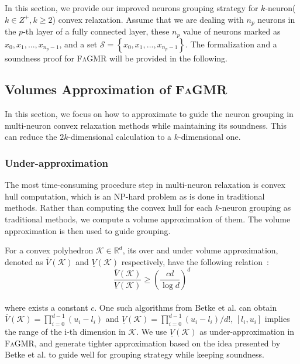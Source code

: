 \documentclass[runningheads]{llncs}
\newcommand{\ourtool}{\textsc{FaGMR}\xspace}
\begin{document}
In this section, we provide our improved neurons grouping
strategy for $k$-neuron($k \in Z^{+}, k \geq 2$) convex relaxation.
Assume that we are dealing with $n_{p}$ neurons in the $p$-th layer of a fully connected layer, these $n_{p}$ value of neurons marked as $x_{0},x_{1},...,x_{n_{p}-1}$, and a set $\mathcal{S}=\left \{x_{0},x_{1},...,x_{n_{p}-1}\right \}$.
The formalization and a soundness proof for \ourtool will be provided in the following.

%
%
%
\subsection{Volumes Approximation of \ourtool}\label{mvee}
In this section, we focus on how to approximate to guide the neuron grouping in multi-neuron convex relaxation methods while maintaining its soundness. This can reduce the $2k$-dimensional calculation to a $k$-dimensional one. 

\subsubsection{Under-approximation}\label{mvee}

The most time-consuming procedure step in multi-neuron relaxation is
convex hull computation, which is an NP-hard problem as is done in traditional methods.
Rather than computing the convex hull for each $k$-neuron grouping
as traditional methods,
we compute a volume approximation of them.
The volume approximation is then used to guide grouping.

For a convex polyhedron $\mathcal{K} \in \mathbb{R}^{d}$, its
over and under volume approximation, denoted as $\overline{V}(\mathcal{K})$ and $\underline{V}(\mathcal{K})$ respectively,
have the following relation~\cite{elekes1986geometric}:
$$
\frac{\overline{V}(\mathcal{K})}{\underline{V}(\mathcal{K})} \geq \left(\frac{cd}{\log d}\right)^{d}
$$\\
where exists a constant $c$.
One such algorithms from Betke et al.
can obtain $\overline{V}(\mathcal{K}) = \prod_{i=0}^{d-1}(u_{i}-l_{i})$ and $\underline{V}(\mathcal{K}) = \prod_{i=0}^{d-1}(u_{i}-l_{i})/d!$, $[l_{i},u_{i}]$ implies the range of the i-th dimension in $\mathcal{K}$.
We use $\underline{V}(\mathcal{K})$ as under-approximation in \ourtool, and generate tighter approximation based on
the idea presented by Betke et al. to guide well for grouping strategy while keeping soundness. 
%
%
%
\end{document}
